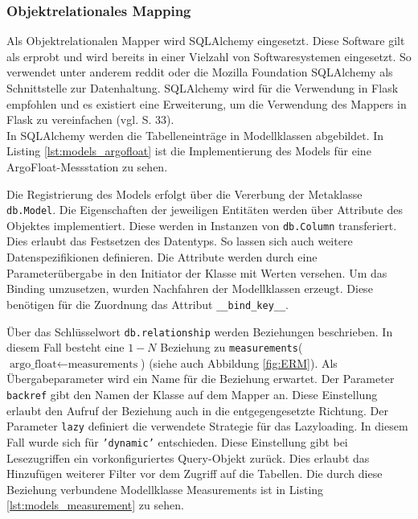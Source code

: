 \subsubsection{Objektrelationales Mapping}\label{sec:implementierungORM}


Als Objektrelationalen Mapper wird SQLAlchemy eingesetzt. Diese Software gilt als erprobt und wird bereits in einer Vielzahl von Softwaresystemen eingesetzt. So verwendet unter anderem reddit oder die Mozilla Foundation SQLAlchemy als Schnittstelle zur Datenhaltung. SQLAlchemy wird für die Verwendung in Flask empfohlen und es existiert eine Erweiterung, um die Verwendung des Mappers in Flask zu vereinfachen (vgl. \cite{openingtheflask} S. 33). \\


In SQLAlchemy werden die Tabelleneinträge in Modellklassen abgebildet. In Listing \ref{lst:models_argofloat} ist die Implementierung des Models für eine ArgoFloat-Messstation zu sehen.


Die Registrierung des Models erfolgt über die Vererbung der Metaklasse \texttt{db.Model}. Die Eigenschaften der jeweiligen Entitäten werden über Attribute des Objektes implementiert. Diese werden in Instanzen von \texttt{db.Column} transferiert. Dies erlaubt das Festsetzen des Datentyps. So lassen sich auch weitere Datenspezifikionen definieren.  Die Attribute werden durch eine Parameterübergabe in den Initiator der Klasse mit Werten versehen.
Um das Binding umzusetzen, wurden Nachfahren der Modellklassen erzeugt. Diese benötigen für die Zuordnung das Attribut \texttt{\_\_bind\_key\_\_}.

Über das Schlüsselwort \texttt{db.relationship} werden Beziehungen beschrieben. In diesem Fall besteht eine $1 - N$ Beziehung  zu \texttt{measurements}($\mbox{argo\_float} \leftarrow \mbox{measurements}$)   (siehe auch Abbildung \ref{fig:ERM}). Als Übergabeparameter wird ein Name für die Beziehung erwartet. Der Parameter \texttt{backref} gibt den Namen der Klasse auf dem Mapper an. Diese Einstellung erlaubt den Aufruf der Beziehung auch in die entgegengesetzte Richtung. Der Parameter \texttt{lazy} definiert die verwendete Strategie für das Lazyloading. In diesem Fall wurde sich für \texttt{'dynamic'} entschieden. Diese Einstellung gibt bei Lesezugriffen ein vorkonfiguriertes Query-Objekt zurück. Dies erlaubt das Hinzufügen weiterer Filter vor dem Zugriff auf die Tabellen. Die durch diese Beziehung verbundene Modellklasse Measurements ist in Listing \ref{lst:models_measurement} zu sehen.

